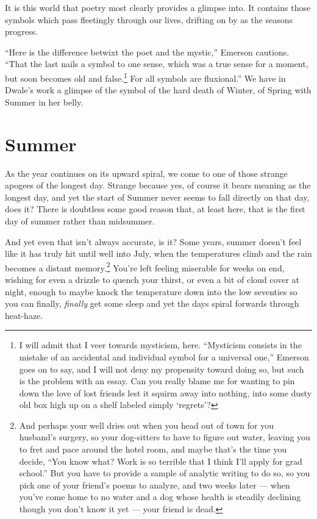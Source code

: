 \documentclass[12pt,oneside]{memoir}
\begin{document}
It is this world that poetry most clearly provides a glimpse into. It contains those symbols which pass fleetingly through our lives, drifting on by as the seasons progress.

``Here is the difference betwixt the poet and the mystic,'' Emerson cautions. ``That the last nails a symbol to one sense, which was a true sense for a moment, but soon becomes old and false.\footnote{I will admit that I veer towards mysticism, here. ``Mysticism consists in the mistake of an accidental and individual symbol for a universal one,'' Emerson goes on to say, and I will not deny my propensity toward doing so, but such is the problem with an essay. Can you really blame me for wanting to pin down the love of lost friends lest it squirm away into nothing, into some dusty old box high up on a shelf labeled simply `regrets'?} For all symbols are fluxional.'' \parencite[33]{emerson} We have in Dwale's work a glimpse of the symbol of the hard death of Winter, of Spring with Summer in her belly.


\clearpage

\section*{Summer}

As the year continues on its upward spiral, we come to one of those strange apogees of the longest day. Strange because yes, of course it bears meaning as the longest day, and yet the start of Summer never seems to fall directly on that day, does it? There is doubtless some good reason that, at least here, that is the first day of summer rather than midsummer.

And yet even that isn't always accurate, is it? Some years, summer doesn't feel like it has truly hit until well into July, when the temperatures climb and the rain becomes a distant memory.\footnote{And perhaps your well dries out when you head out of town for you husband's surgery, so your dog-sitters to have to figure out water, leaving you to fret and pace around the hotel room, and maybe that's the time you decide, ``You know what? Work is so terrible that I think I'll apply for grad school.'' But you have to provide a sample of analytic writing to do so, so you pick one of your friend's poems to analyze, and two weeks later --- when you've come home to no water and a dog whose health is steadily declining though you don't know it yet --- your friend is dead.} You're left feeling miserable for weeks on end, wishing for even a drizzle to quench your thirst, or even a bit of cloud cover at night, enough to maybe knock the temperature down into the low seventies so you can finally, \emph{finally} get some sleep and yet the days spiral forwards through heat-haze.
\end{document}
